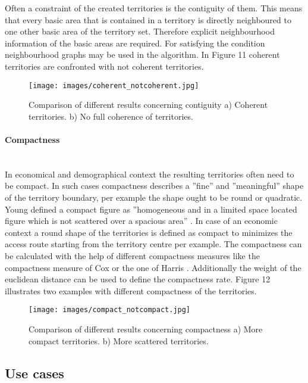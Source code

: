Often a constraint of the created territories is the contiguity of them. This means that every basic area that is contained in a territory is directly neighboured to one other basic area of the territory set. Therefore explicit neighbourhood information of the basic areas are required. For satisfying the condition neighbourhood graphs may be used in the algorithm. In Figure 11 coherent territories are confronted with not coherent territories.

\begin{figure}[H]
	\centering
	\texttt{[image: images/coherent\_notcoherent.jpg]}
	\caption[Comparison of different results concerning contiguity.]{Comparison of different results concerning contiguity a) Coherent territories. b) No full coherence of territories.}
\end{figure} 

\paragraph{Compactness}\mbox{} \\

In economical and demographical context the resulting territories often need to be compact. In such cases compactness describes a ''fine'' and ''meaningful'' shape of the territory boundary, per example the shape ought to be round or quadratic. Young defined a compact figure as ''homogeneous and in a limited space located figure which is not scattered over a spacious area'' \cite{young}. In case of an economic context a round shape of the territories is defined as compact to minimizes the access route starting from the territory centre per example. The compactness can be calculated with the help of different compactness measures like the compactness measure of Cox or the one of Harris \cite{koehler}. Additionally the weight of the euclidean distance can be used to define the compactness rate. Figure 12 illustrates two examples with different compactness of the territories.

\begin{figure}[H]
	\centering
	\texttt{[image: images/compact\_notcompact.jpg]}
	\caption[Comparison of different results concerning compactness.]{Comparison of different results concerning compactness a) More compact territories. b) More scattered territories.}
\end{figure} 


\subsection{Use cases}

